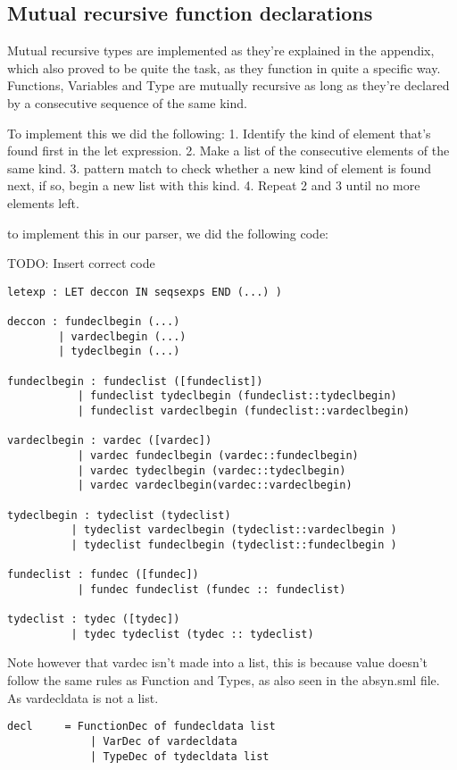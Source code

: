 \documentclass{article}
\begin{document}
\subsection{Mutual recursive function declarations}
Mutual recursive types are implemented as they're explained in the appendix, which also proved to be quite the task, as they function in quite a specific way.
Functions, Variables and Type are mutually recursive as long as they're declared by a consecutive sequence of the same kind. 

To implement this we did the following:
1. Identify the kind of element that's found first in the let expression.
2. Make a list of the consecutive elements of the same kind.
3. pattern match to check whether a new kind of element is found next, if so, begin a new list with this kind.
4. Repeat 2 and 3 until no more elements left.

to implement this in our parser, we did the following code:

TODO: Insert correct code
\begin{lstlisting}[frame=single]
letexp : LET deccon IN seqsexps END (...) )

deccon : fundeclbegin (...)
        | vardeclbegin (...)
        | tydeclbegin (...)

fundeclbegin : fundeclist ([fundeclist])
           | fundeclist tydeclbegin (fundeclist::tydeclbegin)
           | fundeclist vardeclbegin (fundeclist::vardeclbegin)

vardeclbegin : vardec ([vardec])
           | vardec fundeclbegin (vardec::fundeclbegin)
           | vardec tydeclbegin (vardec::tydeclbegin)
           | vardec vardeclbegin(vardec::vardeclbegin)

tydeclbegin : tydeclist (tydeclist)
          | tydeclist vardeclbegin (tydeclist::vardeclbegin )
          | tydeclist fundeclbegin (tydeclist::fundeclbegin )

fundeclist : fundec ([fundec])
           | fundec fundeclist (fundec :: fundeclist)

tydeclist : tydec ([tydec])
          | tydec tydeclist (tydec :: tydeclist)

\end{lstlisting}
Note however that vardec isn't made into a list, this is because value doesn't follow the same rules as Function and Types, as also seen in the absyn.sml file. As vardecldata is not a list.

\begin{lstlisting}[frame=single]
decl     = FunctionDec of fundecldata list
             | VarDec of vardecldata
             | TypeDec of tydecldata list
\end{lstlisting}
\end{document}
